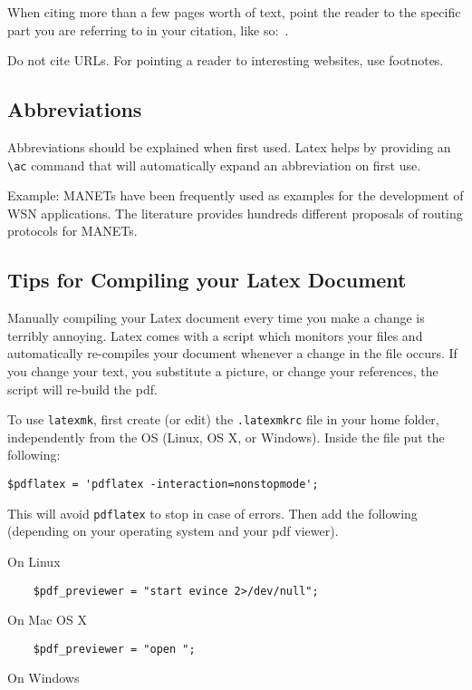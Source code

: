 \documentclass[conference]{IEEEtran}
\begin{document}
When citing more than a few pages worth of text, point the reader to the specific part you are referring to in your citation, like so:~\cite[Table IV]{dietrich2009lifetime}.

Do not cite URLs. For pointing a reader to interesting websites, use footnotes.

\subsection{Abbreviations}

Abbreviations should be explained when first used.
Latex helps by providing an \verb|\ac| command that will automatically expand an abbreviation on first use.

Example: \acp{MANET} have been frequently used as examples for the development of \ac{WSN} applications.
The literature provides hundreds different proposals of routing protocols for \acp{MANET}.
\subsection{Tips for Compiling your Latex Document}

Manually compiling your Latex document every time you make a change is terribly annoying.
Latex comes with a script which monitors your files and automatically re-compiles your document whenever a change in the file occurs.
If you change your text, you substitute a picture, or change your references, the script will re-build the pdf.

To use \texttt{latexmk}, first create (or edit) the \texttt{.latexmkrc} file in your home folder, independently from the OS (Linux, OS X, or Windows).
Inside the file put the following:

{\footnotesize
\begin{verbatim}
$pdflatex = 'pdflatex -interaction=nonstopmode';
\end{verbatim}
}

This will avoid \texttt{pdflatex} to stop in case of errors.
Then add the following (depending on your operating system and your pdf viewer).

On Linux

{\footnotesize
\begin{verbatim}
	$pdf_previewer = "start evince 2>/dev/null";
\end{verbatim}
}
On Mac OS X

{\footnotesize
\begin{verbatim}
	$pdf_previewer = "open ";
\end{verbatim}
}
On Windows
\end{document}
